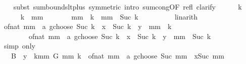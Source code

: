 \begin{isabellebody}
\ \ \isamarkupfalse%
\ {\isacharparenleft}{\kern0pt}subst\ sum{\isacharunderscore}{\kern0pt}bounds{\isacharunderscore}{\kern0pt}lt{\isacharunderscore}{\kern0pt}plus{}\ {\isacharbrackleft}{\kern0pt}symmetric{\isacharbrackright}{\kern0pt}{\isacharcomma}{\kern0pt}\ intro\ sum{\isachardot}{\kern0pt}cong{\isacharbrackleft}{\kern0pt}OF\ refl{\isacharbrackright}{\kern0pt}{\isacharcomma}{\kern0pt}\ clarify{\isacharparenright}{\kern0pt}\isanewline
\ \ \ \ \isamarkupfalse%
\ k\isanewline
\ \ \ \ \isamarkupfalse%
\ {\isachardoublequoteopen}k\ {\isacharless}{\kern0pt}\ mm{\isachardoublequoteclose}\isanewline
\ \ \ \ \isamarkupfalse%
\ \isamarkupfalse%
\ {\isachardoublequoteopen}mm\ {\isacharminus}{\kern0pt}\ k\ {\isacharequal}{\kern0pt}\ mm\ {\isacharminus}{\kern0pt}\ Suc\ k\ {\isacharplus}{\kern0pt}\ {}{\isachardoublequoteclose}\isanewline
\ \ \ \ \ \ \isamarkupfalse%
\ linarith\isanewline
\ \ \ \ \isamarkupfalse%
\ \isamarkupfalse%
\ {\isachardoublequoteopen}{\isacharparenleft}{\kern0pt}of{\isacharunderscore}{\kern0pt}nat\ mm\ {\isacharplus}{\kern0pt}\ a\ gchoose\ Suc\ k{\isacharparenright}{\kern0pt}\ {\isacharasterisk}{\kern0pt}\ x\ {\isacharcircum}{\kern0pt}\ Suc\ k\ {\isacharasterisk}{\kern0pt}\ y\ {\isacharcircum}{\kern0pt}\ {\isacharparenleft}{\kern0pt}mm\ {\isacharminus}{\kern0pt}\ k{\isacharparenright}{\kern0pt}\ {\isacharequal}{\kern0pt}\isanewline
\ \ \ \ \ \ \ \ {\isacharparenleft}{\kern0pt}of{\isacharunderscore}{\kern0pt}nat\ mm\ {\isacharplus}{\kern0pt}\ a\ gchoose\ Suc\ k{\isacharparenright}{\kern0pt}\ {\isacharasterisk}{\kern0pt}\ x\ {\isacharcircum}{\kern0pt}\ Suc\ k\ {\isacharasterisk}{\kern0pt}\ y\ {\isacharcircum}{\kern0pt}\ {\isacharparenleft}{\kern0pt}mm\ {\isacharminus}{\kern0pt}\ Suc\ k\ {\isacharplus}{\kern0pt}\ {}{\isacharparenright}{\kern0pt}{\isachardoublequoteclose}\isanewline
\ \ \ \ \ \ \isamarkupfalse%
\ {\isacharparenleft}{\kern0pt}simp\ only{\isacharcolon}{\kern0pt}{\isacharparenright}{\kern0pt}\isanewline
\ \ \isamarkupfalse%
\isanewline
\ \ \isamarkupfalse%
\ \isamarkupfalse%
\ {\isachardoublequoteopen}{\isasymdots}\ {\isacharplus}{\kern0pt}\ {\isacharquery}{\kern0pt}B\ {\isacharequal}{\kern0pt}\ y\ {\isacharasterisk}{\kern0pt}\ {\isacharparenleft}{\kern0pt}{\isasymSum}k{\isacharequal}{\kern0pt}{}{\isachardot}{\kern0pt}{\isachardot}{\kern0pt}mm{\isachardot}{\kern0pt}\ {\isacharparenleft}{\kern0pt}G\ mm\ k{\isacharparenright}{\kern0pt}{\isacharparenright}{\kern0pt}\ {\isacharplus}{\kern0pt}\ {\isacharparenleft}{\kern0pt}of{\isacharunderscore}{\kern0pt}nat\ mm\ {\isacharplus}{\kern0pt}\ a\ gchoose\ {\isacharparenleft}{\kern0pt}Suc\ mm{\isacharparenright}{\kern0pt}{\isacharparenright}{\kern0pt}\ {\isacharasterisk}{\kern0pt}\ x{\isacharcircum}{\kern0pt}{\isacharparenleft}{\kern0pt}Suc\ mm{\isacharparenright}{\kern0pt}{\isachardoublequoteclose}\isanewline

\end{isabellebody}
